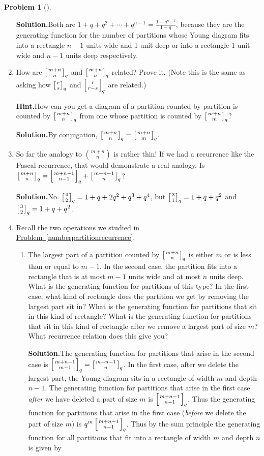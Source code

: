 \documentclass[10pt,]{book}
\theoremstyle{plain}
\theoremstyle{definition}
\newtheorem{activity}[project]{Problem}
\theoremstyle{definition}
\numberwithin{equation}{chapter}
\newcommand{\qchoose}[2]{\left[{#1\atop#2}\right]_q}
\begin{document}
\begin{activity}[]
\begin{enumerate}[font=\bfseries,label=(\alph*),ref=\alph*]
\par\medskip\noindent%
\textbf{Solution.}\quad Both are \(1+q+q^2+\cdots+q^{n-1} = \frac{1-q^{n-1}}{1-q}\), because they are the generating function for the number of partitions whose Young diagram fits into a rectangle \(n-1\) units wide and 1 unit deep or into a rectangle 1 unit wide and \(n-1\) units deep respectively.%
\item\label{task-144} How are \(\qchoose{m+n}{n}\) and \(\qchoose{m+n}{n}\) related? Prove it. (Note this is the same as asking how \(\qchoose{r}{s}\) and \(\qchoose{r}{r-s}\) are related.)%
\par\medskip\noindent%
\textbf{Hint.}\quad How can you get a diagram of a partition counted by partition is counted by \(\qchoose{m+n}{n}\) from one whose partition is counted by \(\qchoose{m+n}{m}\)?%
\par\medskip\noindent%
\textbf{Solution.}\quad By conjugation, \(\qchoose{m+n}{n}=\qchoose{m+n}{m}\).%
\item\label{task-145} So far the analogy to \(\binom{m+n}{n}\) is rather thin! If we had a recurrence like the Pascal recurrence, that would demonstrate a real analogy. Is \(\qchoose{m+n}{n}= \qchoose{m+n-1}{n-1}+\qchoose{m+n-1}{n}\)?%
\par\medskip\noindent%
\textbf{Solution.}\quad No. \(\qchoose{4}{2}=1+q+2q^2+q^3+q^4\), but \(\qchoose{3}{1}=1+q+q^2\) and \(\qchoose{3}{2}=1+q+q^2\).%
\item\label{task-146} Recall the two operations we studied in \hyperref[numberpartitionrecurrence]{Problem~\ref{numberpartitionrecurrence}}.%
\begin{enumerate}[font=\bfseries,label=(\roman*),ref=\theenumi.\roman*]
\item\label{task-147} The largest part of a partition counted by \(\qchoose{m+n}{n}\) is either \(m\) or is less than or equal to \(m-1\).  In the second case, the partition fits into a rectangle that is at most \(m-1\) units wide and at most \(n\) units deep.  What is the generating function for partitions of this type?  In the first case, what kind of rectangle does the partition we get by removing the largest part sit in?  What is the generating function for partitions that sit in this kind of rectangle?  What is the generating function for partitions that sit in this kind of rectangle after we remove a largest part of size \(m\)?  What recurrence relation does this give you?%
\par\medskip\noindent%
\textbf{Solution.}\quad The generating function for partitions that arise in the second case is \(\qchoose{m+n-1}{m-1}=\qchoose{m+n-1}{n}\). In the first case, after we delete the largest part, the Young diagram sits in a rectangle of width \(m\) and depth \(n-1\). The generating function for partitions that arise in the first case \emph{after} we have deleted a part of size \(m\) is \(\qchoose{m+n-1}{n-1}\). Thus the generating function for partitions that arise in the first case (\emph{before} we delete the part of size \(m\)) is \(q^m\qchoose{m+n-1}{n-1}\). Thus by the sum principle the generating function for all partitions that fit into a rectangle of width \(m\) and depth \(n\) is given by%

\end{enumerate}
\end{enumerate}
\end{activity}
\end{document}
